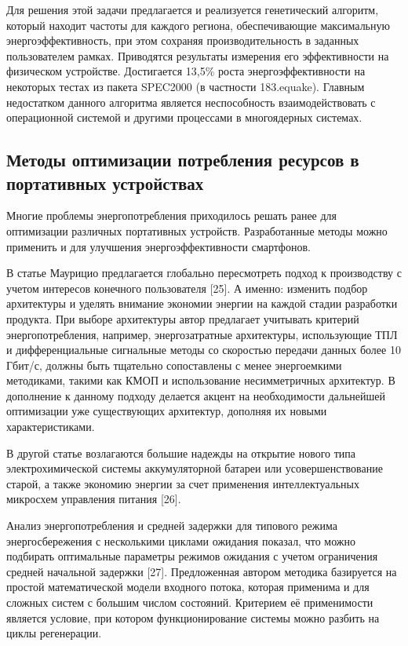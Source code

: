 \documentclass[a4paper,14pt]{extarticle} %
\begin{document}
	Для решения этой задачи предлагается и реализуется генетический алгоритм, который находит частоты для каждого региона, обеспечивающие максимальную энергоэффективность, при этом сохраняя производительность в заданных пользователем рамках. Приводятся результаты измерения его эффективности на физическом устройстве. Достигается 13,5\% роста энергоэффективности на некоторых тестах из пакета SPEC2000 (в частности 183.equake). Главным недостатком данного алгоритма является неспособность взаимодействовать с операционной системой и другими процессами в многоядерных системах.
	
	\subsection{Методы оптимизации потребления ресурсов в портативных устройствах}
	
	Многие проблемы энергопотребления приходилось решать ранее для оптимизации различных портативных устройств. Разработанные методы можно применить и для улучшения энергоэффективности смартфонов. 
	
	В статье Маурицио предлагается глобально пересмотреть подход к производству с учетом интересов конечного пользователя [25]. А именно: изменить подбор архитектуры и уделять внимание экономии энергии на каждой стадии разработки продукта. При выборе архитектуры автор предлагает учитывать критерий энергопотребления, например, энергозатратные архитектуры, использующие ТПЛ и дифференциальные сигнальные методы со скоростью передачи данных более 10 Гбит/с, должны быть тщательно сопоставлены с менее энергоемкими методиками, такими как КМОП и использование несимметричных архитектур. В дополнение к данному подходу делается акцент на необходимости дальнейшей оптимизации уже существующих архитектур, дополняя их новыми характеристиками.
	
	В другой статье возлагаются большие надежды на открытие нового типа электрохимической системы аккумуляторной батареи или усовершенствование старой, а также экономию энергии за счет применения интеллектуальных микросхем управления питания [26].
	
	Анализ энергопотребления и средней задержки для типового режима энергосбережения с несколькими циклами ожидания показал, что можно подбирать оптимальные параметры режимов ожидания с учетом ограничения средней начальной задержки [27]. Предложенная автором методика базируется на простой математической модели входного потока, которая применима и для сложных систем с большим числом состояний. Критерием её применимости является условие, при котором функционирование системы можно разбить на циклы регенерации.
	
\end{document}
